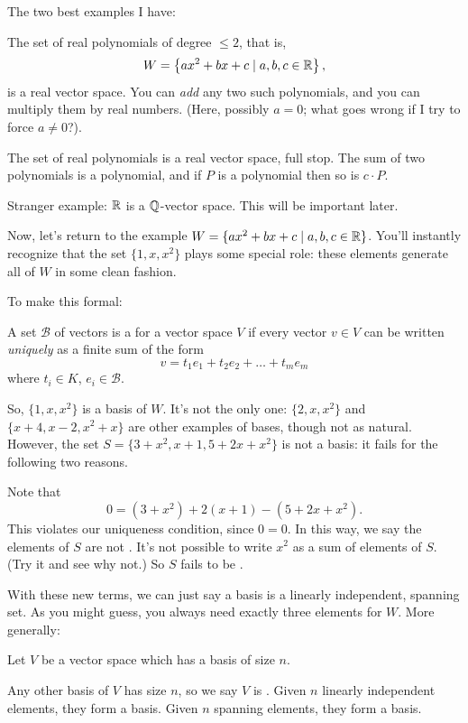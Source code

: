 \documentclass[11pt]{scrartcl}
\begin{document}
The two best examples I have:
\begin{itemize}
  \ii The set of real polynomials of degree $\le 2$, that is,
  \[ W = \left\{ ax^2 + bx + c \mid a,b,c \in \mathbb R \right\}, \]
  is a real vector space.
  You can \emph{add} any two such polynomials,
  and you can multiply them by real numbers.
  (Here, possibly $a=0$; what goes wrong if I try to force $a \neq 0$?).

  \ii The set of real polynomials is a real vector space, full stop.
  The sum of two polynomials is a polynomial, and if $P$ is a polynomial then so is $c \cdot P$.
\end{itemize}
Stranger example: $\mathbb R$ is a $\mathbb Q$-vector space.
This will be important later.

Now, let's return to the example $W = \{ax^2+bx+c \mid a,b,c \in \mathbb R\}$.
You'll instantly recognize that the set $\{1, x, x^2\}$ plays some special role:
these elements generate all of $W$ in some clean fashion.

To make this formal:
\begin{definition}
  A set $\mathcal B$ of vectors is a  for a vector
  space $V$ if every vector $v \in V$ can be written \emph{uniquely}
  as a finite sum of the form
  \begin{equation}
    v = t_1 e_1 + t_2 e_2 + \dots + t_m e_m
    \label{eq:lincomb}
  \end{equation}
  where $t_i \in K$, $e_i \in \mathcal B$.
\end{definition}
So, $\{1, x, x^2\}$ is a basis of $W$.
It's not the only one: $\{2, x, x^2\}$ and $\{x+4, x-2, x^2+x\}$
are other examples of bases, though not as natural.
However, the set $S = \{3+x^2, x+1, 5+2x+x^2\}$ is not a basis:
it fails for the following two reasons.

\begin{itemize}
  \ii Note that
  \[ 0 = (3+x^2) + 2(x+1) - (5+2x+x^2). \]
  This violates our uniqueness condition, since $0 = 0$.
  In this way, we say the elements of $S$
  are not .
  \ii It's not possible to write $x^2$ as a sum of elements of $S$.
  (Try it and see why not.)
  So $S$ fails to be .
\end{itemize}
With these new terms, we can just say a basis is a linearly independent, spanning set.
As you might guess, you always need exactly three elements for $W$.
More generally:
\begin{theorem}
  Let $V$ be a vector space which has a basis of size $n$.
  \begin{enumerate}[(a)]
    \ii Any other basis of $V$ has size $n$,
    so we say $V$ is .
    \ii Given $n$ linearly independent elements, they form a basis.
    \ii Given $n$ spanning elements, they form a basis.
  \end{enumerate}
\end{theorem}
\end{document}
